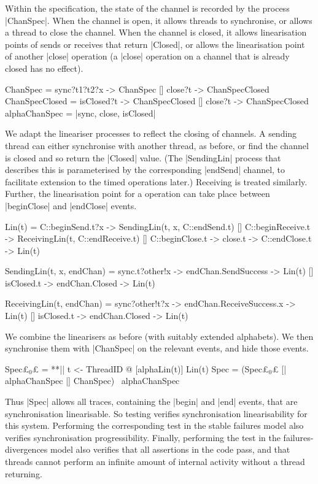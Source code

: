 Within the specification, the state of the channel is recorded by the process
|ChanSpec|.  When the channel is open, it allows threads to synchronise, or
allows a thread to close the channel.  When the channel is closed, it allows
linearisation points of sends or receives that return |Closed|, or allows the
linearisation point of another |close| operation (a |close| operation on a
channel that is already closed has no effect).
%
\begin{cspm}
ChanSpec = sync?t1?t2?x -> ChanSpec [] close?t -> ChanSpecClosed
ChanSpecClosed = isClosed?t -> ChanSpecClosed [] close?t -> ChanSpecClosed
alphaChanSpec = {|sync, close, isClosed|} 
\end{cspm}

We adapt the lineariser processes to reflect the closing of channels.  A
sending thread can either synchronise with another thread, as before, or find
the channel is closed and so return the |Closed| value.  (The |SendingLin|
process that describes this is parameterised by the corresponding |endSend|
channel, to facilitate extension to the timed operations later.)  Receiving is
treated similarly.  Further, the linearisation point for a 
operation can take place between |beginClose| and |endClose| events.
%
\begin{cspm}
Lin(t) = 
  C::beginSend.t?x -> SendingLin(t, x, C::endSend.t)
  [] C::beginReceive.t -> ReceivingLin(t, C::endReceive.t)
  [] C::beginClose.t -> close.t -> C::endClose.t -> Lin(t)

SendingLin(t, x, endChan) = 
  sync.t?other!x -> endChan.SendSuccess -> Lin(t)
  [] isClosed.t -> endChan.Closed -> Lin(t)

ReceivingLin(t, endChan) =  
  sync?other!t?x -> endChan.ReceiveSuccess.x -> Lin(t)
  [] isClosed.t -> endChan.Closed -> Lin(t)
\end{cspm}

We combine the linearisers as before (with suitably extended alphabets).  We
then synchronise them with |ChanSpec| on the relevant events, and hide those
events.
%
\begin{cspm}
Spec£$_0$£ = **|| t <- ThreadID @ [alphaLin(t)] Lin(t)
Spec = (Spec£$_0$£ [| alphaChanSpec |] ChanSpec) \ alphaChanSpec
\end{cspm}
%
Thus |Spec| allows all traces, containing the |begin| and |end| events, that
are synchronisation linearisable.  So testing \CSPM{Spec [T= System}
verifies synchronisation linearisability for this system.  Performing the
corresponding test in the stable failures model also verifies synchronisation
progressibility.  Finally, performing the test in the failures-divergences
model also verifies that all assertions in the code pass, and that threads
cannot perform an infinite amount of internal activity without a thread
returning.

